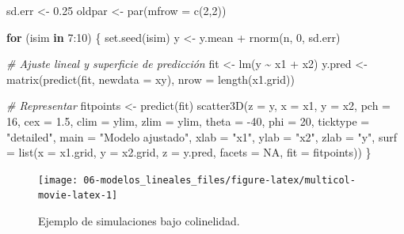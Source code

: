 \documentclass[
  spanish,
]{book}
\newenvironment{Shaded}{\begin{snugshade}}{\end{snugshade}}
\newcommand{\AttributeTok}[1]{\textcolor[rgb]{0.77,0.63,0.00}{#1}}
\newcommand{\CommentTok}[1]{\textcolor[rgb]{0.56,0.35,0.01}{\textit{#1}}}
\newcommand{\ConstantTok}[1]{\textcolor[rgb]{0.00,0.00,0.00}{#1}}
\newcommand{\ControlFlowTok}[1]{\textcolor[rgb]{0.13,0.29,0.53}{\textbf{#1}}}
\newcommand{\DecValTok}[1]{\textcolor[rgb]{0.00,0.00,0.81}{#1}}
\newcommand{\FloatTok}[1]{\textcolor[rgb]{0.00,0.00,0.81}{#1}}
\newcommand{\FunctionTok}[1]{\textcolor[rgb]{0.00,0.00,0.00}{#1}}
\newcommand{\NormalTok}[1]{#1}
\newcommand{\OtherTok}[1]{\textcolor[rgb]{0.56,0.35,0.01}{#1}}
\newcommand{\SpecialCharTok}[1]{\textcolor[rgb]{0.00,0.00,0.00}{#1}}
\newcommand{\StringTok}[1]{\textcolor[rgb]{0.31,0.60,0.02}{#1}}
\theoremstyle{break}
\theoremstyle{definition}
\theoremstyle{definition}
\theoremstyle{definition}
\theoremstyle{definition}
\theoremstyle{remark}
\begin{document}
\begin{Shaded}
\begin{Highlighting}[]
\NormalTok{sd.err }\OtherTok{\textless{}{-}} \FloatTok{0.25}
\NormalTok{oldpar }\OtherTok{\textless{}{-}} \FunctionTok{par}\NormalTok{(}\AttributeTok{mfrow =} \FunctionTok{c}\NormalTok{(}\DecValTok{2}\NormalTok{,}\DecValTok{2}\NormalTok{))}

\ControlFlowTok{for}\NormalTok{ (isim }\ControlFlowTok{in} \DecValTok{7}\SpecialCharTok{:}\DecValTok{10}\NormalTok{) \{}
  \FunctionTok{set.seed}\NormalTok{(isim)}
\NormalTok{  y }\OtherTok{\textless{}{-}}\NormalTok{ y.mean }\SpecialCharTok{+} \FunctionTok{rnorm}\NormalTok{(n, }\DecValTok{0}\NormalTok{, sd.err)}
  
  \CommentTok{\# Ajuste lineal y superficie de predicción}
\NormalTok{  fit }\OtherTok{\textless{}{-}} \FunctionTok{lm}\NormalTok{(y }\SpecialCharTok{\textasciitilde{}}\NormalTok{ x1 }\SpecialCharTok{+}\NormalTok{ x2)}
\NormalTok{  y.pred }\OtherTok{\textless{}{-}} \FunctionTok{matrix}\NormalTok{(}\FunctionTok{predict}\NormalTok{(fit, }\AttributeTok{newdata =}\NormalTok{ xy), }\AttributeTok{nrow =} \FunctionTok{length}\NormalTok{(x1.grid)) }
  
  \CommentTok{\# Representar}
\NormalTok{  fitpoints }\OtherTok{\textless{}{-}} \FunctionTok{predict}\NormalTok{(fit) }
  \FunctionTok{scatter3D}\NormalTok{(}\AttributeTok{z =}\NormalTok{ y, }\AttributeTok{x =}\NormalTok{ x1, }\AttributeTok{y =}\NormalTok{ x2, }\AttributeTok{pch =} \DecValTok{16}\NormalTok{, }\AttributeTok{cex =} \FloatTok{1.5}\NormalTok{, }\AttributeTok{clim =}\NormalTok{ ylim, }\AttributeTok{zlim =}\NormalTok{ ylim,}
            \AttributeTok{theta =} \SpecialCharTok{{-}}\DecValTok{40}\NormalTok{, }\AttributeTok{phi =} \DecValTok{20}\NormalTok{, }\AttributeTok{ticktype =} \StringTok{"detailed"}\NormalTok{, }
            \AttributeTok{main =} \StringTok{"Modelo ajustado"}\NormalTok{, }\AttributeTok{xlab =} \StringTok{"x1"}\NormalTok{, }\AttributeTok{ylab =} \StringTok{"x2"}\NormalTok{, }\AttributeTok{zlab =} \StringTok{"y"}\NormalTok{, }
            \AttributeTok{surf =} \FunctionTok{list}\NormalTok{(}\AttributeTok{x =}\NormalTok{ x1.grid, }\AttributeTok{y =}\NormalTok{ x2.grid, }\AttributeTok{z =}\NormalTok{ y.pred, }
                        \AttributeTok{facets =} \ConstantTok{NA}\NormalTok{, }\AttributeTok{fit =}\NormalTok{ fitpoints))}
\NormalTok{\}}
\end{Highlighting}
\end{Shaded}

\begin{figure}[!htb]

{\centering \texttt{[image: 06-modelos\_lineales\_files/figure-latex/multicol-movie-latex-1]} 

}

\caption{Ejemplo de simulaciones bajo colinelidad.}\label{fig:multicol-movie-latex}
\end{figure}
\end{document}
